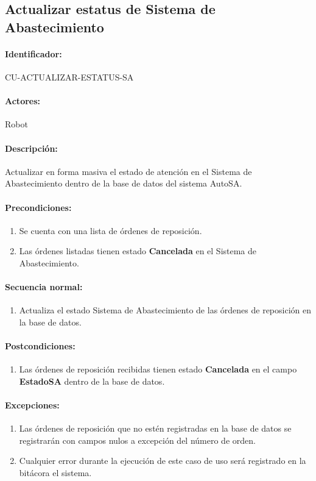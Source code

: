 \subsection{Actualizar estatus de Sistema de Abastecimiento}\label{cu-actualizar-estatus-sa}
\paragraph{Identificador:}
CU-ACTUALIZAR-ESTATUS-SA
\paragraph{Actores:}
Robot
\paragraph{Descripción:}
Actualizar en forma masiva el estado de atención en el Sistema de Abastecimiento dentro de la base de datos del sistema AutoSA.
\paragraph{Precondiciones:}
\begin{enumerate}
  \item Se cuenta con una lista de órdenes de reposición.
  \item Las órdenes listadas tienen estado \textbf{Cancelada} en el Sistema de Abastecimiento. 
\end{enumerate}
\paragraph{Secuencia normal:}
\begin{enumerate}
  \item Actualiza el estado Sistema de Abastecimiento de las órdenes de reposición en la base de datos.
\end{enumerate}
\paragraph{Postcondiciones:}
\begin{enumerate}
  \item Las órdenes de reposición recibidas tienen estado \textbf{Cancelada} en el campo \textbf{EstadoSA} dentro de la base de datos.
\end{enumerate}
\paragraph{Excepciones:}
\begin{enumerate}
  \item Las órdenes de reposición que no estén registradas en la base de datos se registrarán con campos nulos a excepción del número de orden.
  \item Cualquier error durante la ejecución de este caso de uso será registrado en la bitácora el sistema.
\end{enumerate}


